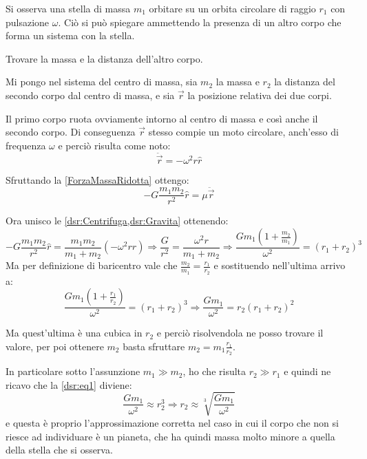 \documentclass[../main.tex]{subfiles}
\begin{document}
\textex
Si osserva una stella di massa $m_1$ orbitare su un orbita circolare di raggio $r_1$ con pulsazione $\omega$. Ciò si può spiegare ammettendo la presenza di un altro corpo che forma un sistema con la stella.

Trovare la massa e la distanza dell'altro corpo.

\solution
Mi pongo nel sistema del centro di massa, sia $m_2$ la massa e $r_2$ la distanza del secondo corpo dal centro di massa, e sia $\vec r$ la posizione relativa dei due corpi. 

Il primo corpo ruota ovviamente intorno al centro di massa e così anche il secondo corpo. Di conseguenza $\vec r$ stesso compie un moto circolare, anch'esso di frequenza $\omega$ e perciò risulta come noto:
\begin{equation}\label{dsr:Centrifuga}
	\ddot{\vec r}=-\omega^2r\hat r
\end{equation}

Sfruttando la \cref{ForzaMassaRidotta} ottengo:
\begin{equation}\label{dsr:Gravita}
	-G\frac{m_1m_2}{r^2}\hat r = \mu \ddot{\vec r}
\end{equation}

Ora unisco le \cref{dsr:Centrifuga,dsr:Gravita} ottenendo:
\begin{equation*}
	-G\frac{m_1m_2}{r^2}\hat r=\frac{m_1m_2}{m_1+m_2}\left(-\omega^2r\hat r\right) \Rightarrow \frac G{r^2}=\frac{\omega^2r}{m_1+m_2}
	\Rightarrow \frac{Gm_1\left(1+\frac{m_2}{m_1}\right)}{\omega^2}=(r_1+r_2)^3
\end{equation*}
Ma per definizione di baricentro vale che $\frac{m_2}{m_1}=\frac{r_1}{r_2}$ e sostituendo nell'ultima arrivo a:
\begin{equation}\label{dsr:eq1}
	\frac{Gm_1\left(1+\frac{r_1}{r_2}\right)}{\omega^2}=(r_1+r_2)^3\Rightarrow \frac{Gm_1}{\omega^2}=r_2(r_1+r_2)^2
\end{equation}

Ma quest'ultima è una cubica in $r_2$ e perciò risolvendola ne posso trovare il valore, per poi ottenere $m_2$ basta sfruttare $m_2=m_1\frac{r_1}{r_2}$.

In particolare sotto l'assunzione $m_1\gg m_2$, ho che risulta $r_2\gg r_1$ e quindi ne ricavo che la \cref{dsr:eq1} diviene:
\begin{equation*}
	\frac{Gm_1}{\omega^2}\approx r_2^3 \Rightarrow r_2\approx\sqrt[3]{\frac{Gm_1}{\omega^2}}
\end{equation*}
e questa è proprio l'approssimazione corretta nel caso in cui il corpo che non si riesce ad individuare è un pianeta, che ha quindi massa molto minore a quella della stella che si osserva.
\end{document}

